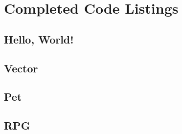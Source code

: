 \section{Completed Code Listings}

	\subsection{Hello, World!}

		
		
		
		
		
	
	\newpage
	\subsection{Vector}
		
	
	\newpage
	\subsection{Pet}
	
		
		
		
	
	\newpage
	\subsection{RPG}